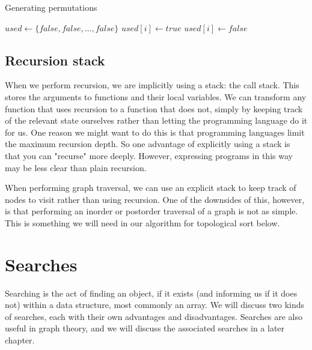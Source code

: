 \begin{algorithm}[H]
\caption{Generating permutations}
\begin{algorithmic}

\State $used \gets \{false, false, \ldots, false\}$
        \State {}
        \State \Return
    \EndIf
            \State $used[i] \gets true$
            \State {}
            \State $used[i] \gets false$
        \EndIf
    \EndFor
\EndFunction

\end{algorithmic}
\end{algorithm}


\subsection{Recursion stack}
When we perform recursion, we are implicitly using a stack: the call stack. This stores the arguments to functions and their local variables. We can transform any function that uses recursion to a function that does not, simply by keeping track of the relevant state ourselves rather than letting the programming language do it for us. One reason we might want to do this is that programming languages limit the maximum recursion depth. So one advantage of explicitly using a stack is that you can "recurse" more deeply. However, expressing programs in this way may be less clear than plain recursion.

When performing graph traversal, we can use an explicit stack to keep track of nodes to visit rather than using recursion. One of the downsides of this, however, is that performing an inorder or postorder traversal of a graph is not as simple. This is something we will need in our algorithm for topological sort below.

\section{Searches}

Searching is the act of finding an object, if it exists (and informing us if it does not) within a data structure, most commonly an array.  We will discuss two kinds of searches, each with their own advantages and disadvantages.  Searches are also useful in graph theory, and we will discuss the associated searches in a later chapter.

